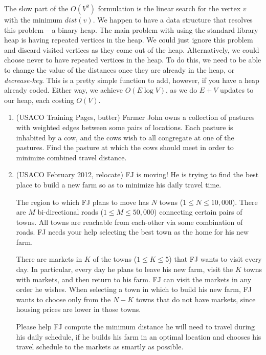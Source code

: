 The slow part of the $O(V^2)$ formulation is the linear search for the vertex $v$ with the minimum $dist(v)$. We happen to have a data structure that resolves this problem -- a binary heap. The main problem with using the standard library heap is having repeated vertices in the heap. We could just ignore this problem and discard visited vertices as they come out of the heap. Alternatively, we could choose never to have repeated vertices in the heap. To do this, we need to be able to change the value of the distances once they are already in the heap, or \textit{decrease-key}. This is a pretty simple function to add, however, if you have a heap already coded. Either way, we achieve $O(E \log{V})$, as we do $E+V$ updates to our heap, each costing $O(V)$.

\begin{enumerate}

\item
(USACO Training Pages, butter)
Farmer John owns a collection of pastures with weighted edges between some
pairs of locations. Each pasture is inhabited by a cow, and the cows wish to all congregate at one of the
pastures. Find the pasture at which the cows should meet in order to minimize combined travel distance.

\item
(USACO February 2012, relocate)
FJ is moving! He is trying to find the best place to build a new farm so as to
minimize his daily travel time.

The region to which FJ plans to move has $N$ towns ($1 \le N \le 10, 000$). There are $M$ bi-directional roads
($1 \le M \le 50, 000$) connecting certain pairs of towns. All towns are reachable from each-other via some
combination of roads. FJ needs your help selecting the best town as the home for his new farm.

There are markets in $K$ of the towns ($1 \le K \le 5$) that FJ wants to visit every day. In particular, every day
he plans to leave his new farm, visit the $K$ towns with markets, and then return to his farm. FJ can visit the
markets in any order he wishes. When selecting a town in which to build his new farm, FJ wants to choose
only from the $N - K$ towns that do not have markets, since housing prices are lower in those towns.

Please help FJ compute the minimum distance he will need to travel during his daily schedule, if he builds his
farm in an optimal location and chooses his travel schedule to the markets as smartly as possible.


\end{enumerate}
